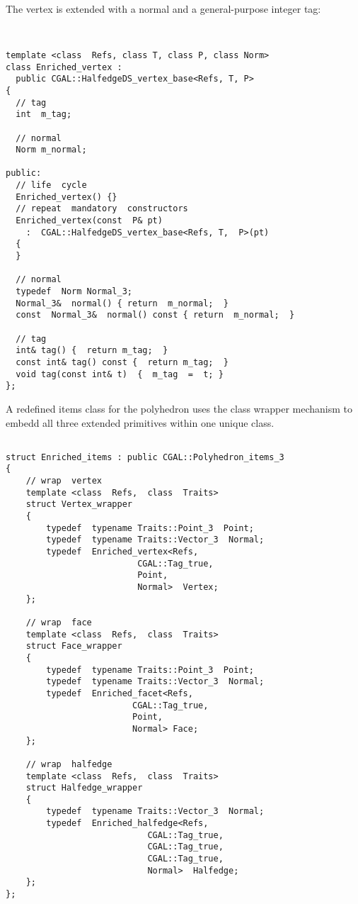 The vertex is extended with a normal and a general-purpose integer
tag:

{ \scriptsize
\begin{verbatim}


template <class  Refs, class T, class P, class Norm>
class Enriched_vertex :  
  public CGAL::HalfedgeDS_vertex_base<Refs, T, P>
{
  // tag
  int  m_tag; 

  // normal
  Norm m_normal;

public:
  // life  cycle
  Enriched_vertex() {}
  // repeat  mandatory  constructors
  Enriched_vertex(const  P& pt)
    :  CGAL::HalfedgeDS_vertex_base<Refs, T,  P>(pt)
  {
  }

  // normal
  typedef  Norm Normal_3;
  Normal_3&  normal() { return  m_normal;  }
  const  Normal_3&  normal() const { return  m_normal;  }

  // tag
  int& tag() {  return m_tag;  }
  const int& tag() const {  return m_tag;  }
  void tag(const int& t)  {  m_tag  =  t; }
};

\end{verbatim}}



A redefined items class for the polyhedron uses the class wrapper
mechanism to embedd all three extended primitives within one unique
class.

{ \scriptsize
\begin{verbatim}

struct Enriched_items : public CGAL::Polyhedron_items_3
{
    // wrap  vertex
    template <class  Refs,  class  Traits>
    struct Vertex_wrapper
    {
        typedef  typename Traits::Point_3  Point;
        typedef  typename Traits::Vector_3  Normal;
        typedef  Enriched_vertex<Refs,
                          CGAL::Tag_true,
                          Point,
                          Normal>  Vertex;
    };

    // wrap  face
    template <class  Refs,  class  Traits>
    struct Face_wrapper
    {
        typedef  typename Traits::Point_3  Point;
        typedef  typename Traits::Vector_3  Normal;
        typedef  Enriched_facet<Refs,
                         CGAL::Tag_true,
                         Point,
                         Normal> Face;
    };

    // wrap  halfedge
    template <class  Refs,  class  Traits>
    struct Halfedge_wrapper
    {
        typedef  typename Traits::Vector_3  Normal;
        typedef  Enriched_halfedge<Refs,
                            CGAL::Tag_true,
                            CGAL::Tag_true,
                            CGAL::Tag_true,
                            Normal>  Halfedge;
    };
};
\end{verbatim}}

